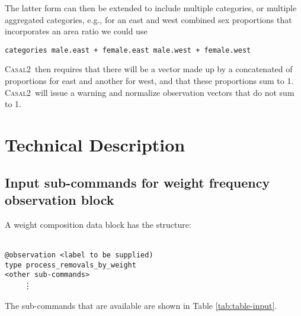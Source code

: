 \documentclass[a4paper,11pt,twoside,pdftex,draft]{article}
\newcommand{\CNAME}{\textsc{Casal2}}
\begin{document}
The latter form can then be extended to include multiple categories, or multiple aggregated categories, e.g., for an east and west combined sex proportions that incorporates an area ratio we could use

\texttt{categories male.east + female.east   male.west + female.west}

\CNAME~then requires that there will be a vector made up by a concatenated of proportions for east and another for west, and that these proportions sum to 1. \CNAME~will issue a warning and normalize observation vectors that do not sum to 1.

\section{Technical Description}

\subsection{Input sub-commands for weight frequency observation block}

A weight composition data block has the structure:

\texttt{\\
@observation <label to be supplied)\\
type process\_removals\_by\_weight\\
<other sub-commands>\\
}
\textcolor{white}{.}~~~~\vdots


The sub-commands that are available are shown in Table \ref{tab:table-input}.
\end{document}
